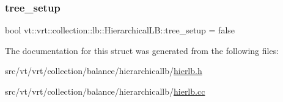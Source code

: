 \mbox{\label{structvt_1_1vrt_1_1collection_1_1lb_1_1_hierarchical_l_b_abd4e7b54c632de1dc2f2751676328f3d}} 
\subsubsection{\texorpdfstring{tree\+\_\+setup}{tree\_setup}}
{\footnotesize\ttfamily bool vt\+::vrt\+::collection\+::lb\+::\+Hierarchical\+L\+B\+::tree\+\_\+setup = false\hspace{0.3cm}{\ttfamily [private]}}



The documentation for this struct was generated from the following files\+:\begin{DoxyCompactItemize}
\item 
src/vt/vrt/collection/balance/hierarchicallb/\hyperlink{hierlb_8h}{hierlb.\+h}\item 
src/vt/vrt/collection/balance/hierarchicallb/\hyperlink{hierlb_8cc}{hierlb.\+cc}\end{DoxyCompactItemize}
